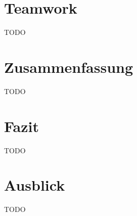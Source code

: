 \documentclass[a4paper]{article}
\begin{document}
\section{Teamwork}
\label{sec:teamwork}
TODO


\section{Zusammenfassung}
\label{sec:summary}
TODO


\section{Fazit}
\label{sec:conclusion}
TODO


\section{Ausblick}
\label{sec:outlook}
TODO


\printbibliography[title={Referenzen}]
\end{document}
